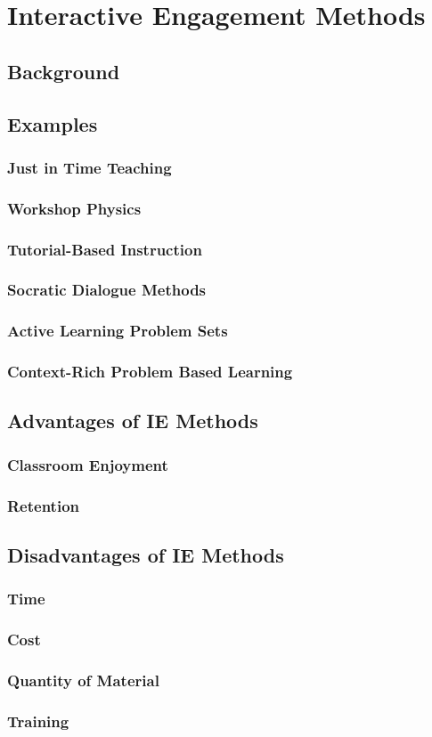 \chapter[Chapter 3: Interactive Engagement Methods]{Interactive Engagement Methods}

\section{Background}

\section{Examples}

\subsection{Just in Time Teaching}
\subsection{Workshop Physics}
\subsection{Tutorial-Based Instruction}
\subsection{Socratic Dialogue Methods}
\subsection{Active Learning Problem Sets}
\subsection{Context-Rich Problem Based Learning}

\section{Advantages of IE Methods}

\subsection{Classroom Enjoyment}
\subsection{Retention}

\section{Disadvantages of IE Methods}

\subsection{Time}
\subsection{Cost}
\subsection{Quantity of Material}
\subsection{Training}